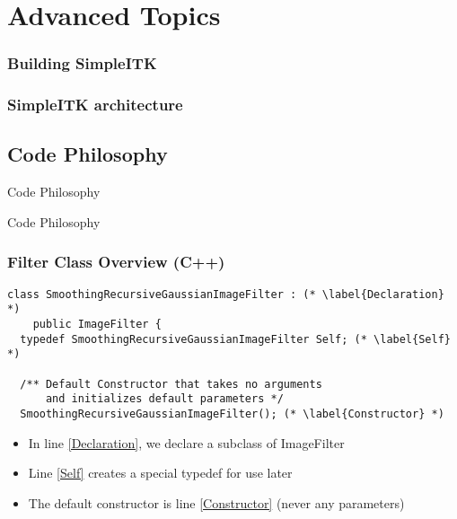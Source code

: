 \section{Advanced Topics}

\begin{frame}
\frametitle{Building SimpleITK}
\end{frame}

\begin{frame}
\frametitle{SimpleITK architecture}
\end{frame}

\subsection{Code Philosophy}
\begin{frame}{Code Philosophy}
\fontsize{36pt}{36pt}\selectfont
\center
\begin{center}
Code Philosophy
\end{center}
\end{frame}

\begin{frame}[fragile]
\frametitle{Filter Class Overview (C++)}
\lstcpp
\begin{lstlisting}
class SmoothingRecursiveGaussianImageFilter : (* \label{Declaration} *)
    public ImageFilter {
  typedef SmoothingRecursiveGaussianImageFilter Self; (* \label{Self} *)

  /** Default Constructor that takes no arguments
      and initializes default parameters */
  SmoothingRecursiveGaussianImageFilter(); (* \label{Constructor} *)

\end{lstlisting}
\begin{itemize}
  \item In line \ref{Declaration}, we declare a subclass of ImageFilter
  \item Line \ref{Self} creates a special typedef for use later
  \item The default constructor is line \ref{Constructor} (never any parameters)
\end{itemize}
\end{frame}


